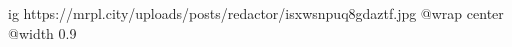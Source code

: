  
 
 
 
 

\ifcmt
  ig https://mrpl.city/uploads/posts/redactor/isxwsnpuq8gdaztf.jpg
  @wrap center
  @width 0.9
\fi
